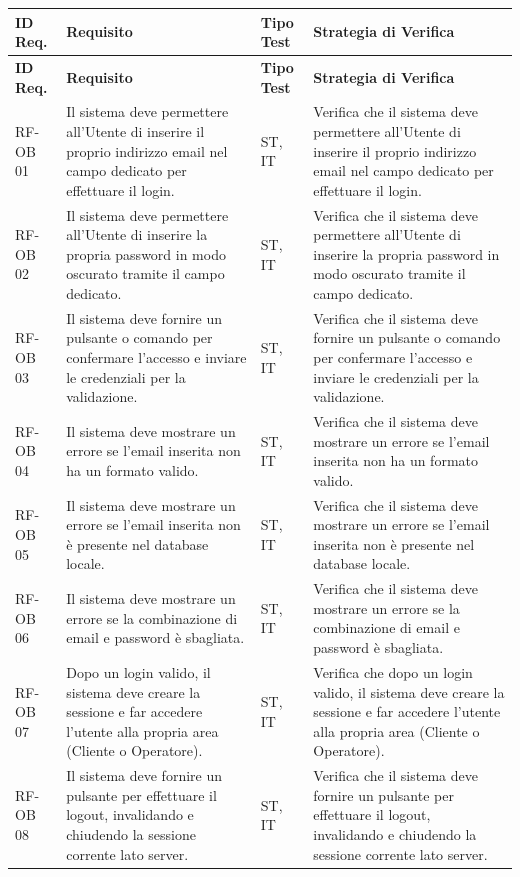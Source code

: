 \documentclass[a4paper,11pt,oneside]{scrartcl}
\begin{document}
\begin{longtable}{|p{1.5cm}|p{4.5cm}|p{1.8cm}|p{6cm}|}
\hline
\textbf{ID Req.} & \textbf{Requisito} & \textbf{Tipo Test} & \textbf{Strategia di Verifica} \\
\hline
\endfirsthead
\hline
\textbf{ID Req.} & \textbf{Requisito} & \textbf{Tipo Test} & \textbf{Strategia di Verifica} \\
\hline
\endhead

RF-OB 01 & Il sistema deve permettere all'Utente di inserire il proprio indirizzo email nel campo dedicato per effettuare il login. & ST, IT & Verifica che il sistema deve permettere all'Utente di inserire il proprio indirizzo email nel campo dedicato per effettuare il login. \\ \hline
RF-OB 02 & Il sistema deve permettere all'Utente di inserire la propria password in modo oscurato tramite il campo dedicato. & ST, IT & Verifica che il sistema deve permettere all'Utente di inserire la propria password in modo oscurato tramite il campo dedicato. \\ \hline
RF-OB 03 & Il sistema deve fornire un pulsante o comando per confermare l'accesso e inviare le credenziali per la validazione. & ST, IT & Verifica che il sistema deve fornire un pulsante o comando per confermare l'accesso e inviare le credenziali per la validazione. \\ \hline
RF-OB 04 & Il sistema deve mostrare un errore se l'email inserita non ha un formato valido. & ST, IT & Verifica che il sistema deve mostrare un errore se l'email inserita non ha un formato valido. \\ \hline
RF-OB 05 & Il sistema deve mostrare un errore se l'email inserita non è presente nel database locale. & ST, IT & Verifica che il sistema deve mostrare un errore se l'email inserita non è presente nel database locale. \\ \hline
RF-OB 06 & Il sistema deve mostrare un errore se la combinazione di email e password è sbagliata. & ST, IT & Verifica che il sistema deve mostrare un errore se la combinazione di email e password è sbagliata. \\ \hline
RF-OB 07 & Dopo un login valido, il sistema deve creare la sessione e far accedere l'utente alla propria area (Cliente o Operatore). & ST, IT & Verifica che dopo un login valido, il sistema deve creare la sessione e far accedere l'utente alla propria area (Cliente o Operatore). \\ \hline
RF-OB 08 & Il sistema deve fornire un pulsante per effettuare il logout, invalidando e chiudendo la sessione corrente lato server. & ST, IT & Verifica che il sistema deve fornire un pulsante per effettuare il logout, invalidando e chiudendo la sessione corrente lato server. \\ \hline

\end{longtable}
\end{document}
